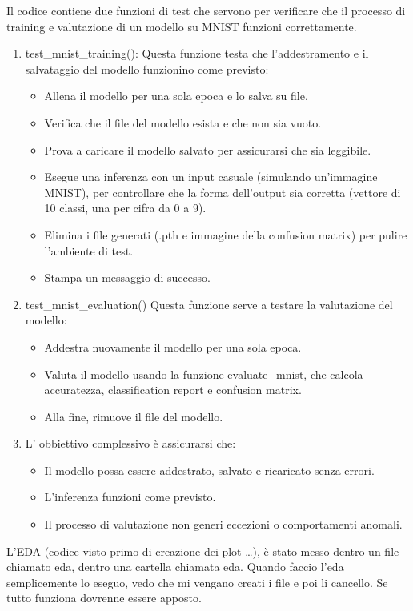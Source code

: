 \documentclass[a4paper,12pt]{article}
\begin{document}
Il codice contiene due funzioni di test che servono per verificare che il processo di training e valutazione di un modello su MNIST funzioni correttamente.
\begin{enumerate}
    \item  test\_mnist\_training():
    Questa funzione testa che l'addestramento e il salvataggio del modello funzionino come previsto:
    \begin{itemize}
        \item Allena il modello per una sola epoca e lo salva su file.
        \item Verifica che il file del modello esista e che non sia vuoto.
        \item Prova a caricare il modello salvato per assicurarsi che sia leggibile.
        \item Esegue una inferenza con un input casuale (simulando un'immagine MNIST), per controllare che la forma dell'output sia corretta (vettore di 10 classi, una per cifra da 0 a 9).
        \item Elimina i file generati (.pth e immagine della confusion matrix) per pulire l'ambiente di test.
        \item Stampa un messaggio di successo.
    \end{itemize}
    \item test\_mnist\_evaluation()
    Questa funzione serve a testare la valutazione del modello:
    \begin{itemize}
        \item Addestra nuovamente il modello per una sola epoca.
        \item Valuta il modello usando la funzione evaluate\_mnist, che calcola accuratezza, classification report e confusion matrix.
        \item Alla fine, rimuove il file del modello.
    \end{itemize}
    \item L' obbiettivo complessivo è assicurarsi che:
    \begin{itemize}
        \item Il modello possa essere addestrato, salvato e ricaricato senza errori.
        \item L'inferenza funzioni come previsto.
        \item Il processo di valutazione non generi eccezioni o comportamenti anomali.
    \end{itemize}
\end{enumerate}
L'EDA (codice visto primo di creazione dei plot \dots), è stato messo dentro un file chiamato eda, dentro una cartella chiamata eda. Quando faccio l'eda semplicemente lo eseguo, vedo che mi vengano creati i file e poi li cancello. Se tutto funziona dovrenne essere apposto.
\end{document}
